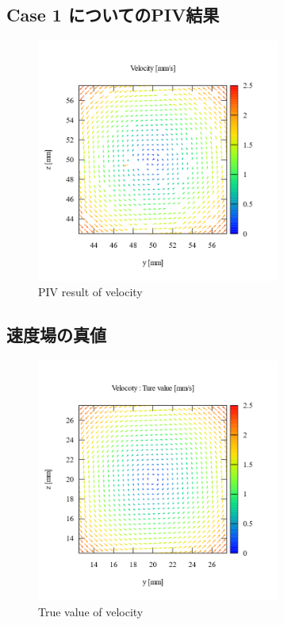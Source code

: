 \documentclass[twocolumn,a4j]{jsarticle}
\begin{document}
\subsection{Case 1 についてのPIV結果}
\begin{figure}[htbp]
  \footnotesize
  \begin{center}
    \includegraphics[width=80mm]{../images/vector_simulation.png}
    \caption{PIV result of velocity}
  \end{center}
\end{figure}

\newpage
\subsection{速度場の真値}
\begin{figure}[htbp]
  \footnotesize
  \begin{center}
    \includegraphics[width=80mm]{../images/vector_true_value.png}
    \caption{True value of velocity}
  \end{center}
\end{figure}
\end{document}
